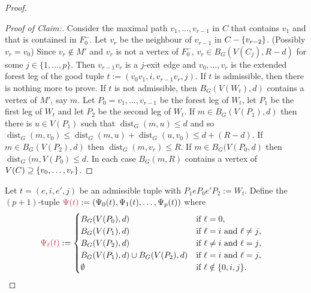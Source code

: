 \documentclass{patmorin}
\newenvironment{clmproof}{\begin{proof}[Proof of Claim:]\renewcommand{\qedsymbol}{\rule{1ex}{1ex}}}{\end{proof}}
\DeclareMathOperator{\dist}{dist}
\DeclarePairedDelimiter\set{\{}{\}}
\begin{document}
\begin{proof}
\begin{clmproof}
  Consider the maximal path $v_1,\ldots,v_{r-1}$ in $C$ that contains $v_1$ and that is contained in $F_0^-$. Let $v_r$ be the neighbour of $v_{r-1}$ in $C-\set{v_{r-2}}$.  (Possibly $v_r=v_0$)  Since $v_r\notin M'$ and $v_r$ is not a vertex of $F_0^-$, $v_r\in B_G(V(C_j),R-d)$ for some $j\in\{1,\ldots,p\}$.   Then $v_{r-1}v_r$ is a $j$-exit edge and $v_0,\ldots,v_{r}$ is the extended forest leg of the good tuple $t:=(v_0v_1,i,v_{r-1}v_r,j)$.   If $t$ is admissible, then there is nothing more to prove.  If $t$ is not admissible, 
  then $B_G(V(W_t),d)$ contains a vertex of $M'$, say $m$.  
  Let $P_0=v_1,\ldots,v_{r-1}$ be the forest leg of $W_t$, let $P_1$ be the first leg of $W_t$ and let $P_2$ be the second leg of $W_t$. 
  If $m\in B_G(V(P_1),d)$ then there is $u\in V(P_1)$ such that $\dist_G(m,u)\leq d$ and so 
  $\dist_G(m,v_0)\le \dist_G(m,u) + \dist_G(u,v_0)\le d + (R-d)$.  
  If $m\in B_G(V(P_2),d)$ then $\dist_G(m,v_r)\le R$.  If $m\in B_G(V(P_0,d)$ then $\dist_G(m,V(P_0)\le d$.  In each case $B_G(m,R)$ contains a vertex of $V(C)\supseteq \set{v_0,\ldots,v_r}$.
\end{clmproof}


Let $t=(e,i,e',j)$ be an admissible tuple with $P_1eP_0e'P_2:=W_t$.
Define the $(p+1)$-tuple $\mathdefin{\Psi(t)}:=(\Psi_0(t),\Psi_1(t),\ldots,\Psi_p(t))$ where
\begin{align*}
\mathdefin{\Psi_\ell(t)} &:=\begin{cases}
B_{G}(V(P_0),d)&\textrm{if $\ell=0$,}\\
B_{G}(V(P_1),d)&\textrm{if $\ell=i$ and $\ell\neq j$,}\\
B_{G}(V(P_2),d)&\textrm{if $\ell\neq i$ and $\ell= j$,}\\
B_{G}(V(P_1),d)\cup B_{G}(V(P_2),d)&\textrm{if $\ell= i$ and $\ell= j$,}\\
\emptyset&\textrm{if $\ell\notin\{0,i,j\}$.}
\end{cases}
\end{align*}


\end{proof}
\end{document}
